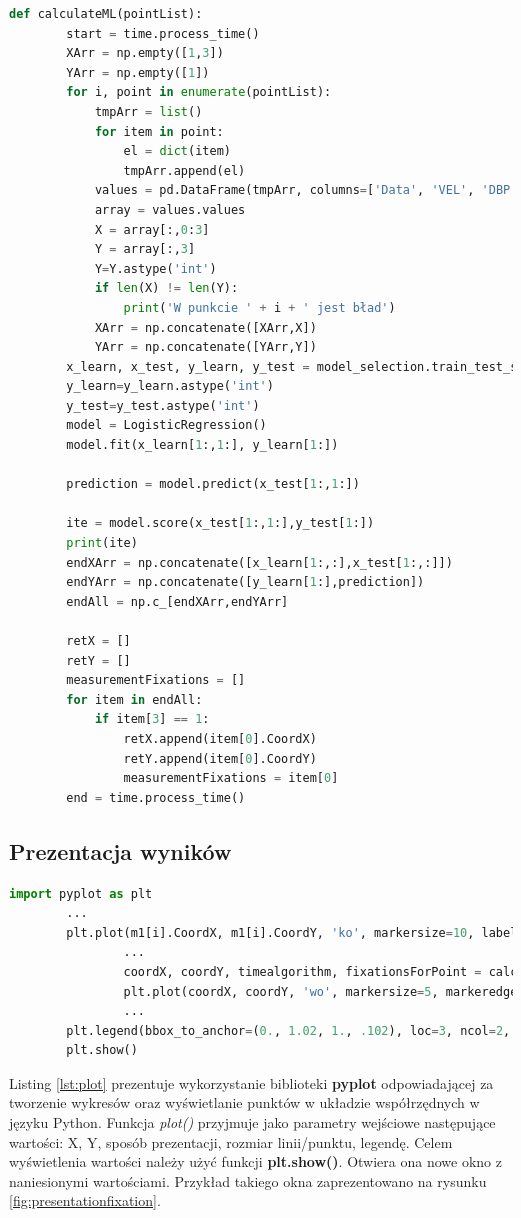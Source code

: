 \begin{lstlisting}[language=Python, caption=Algorytm wykorzystujący uczenie maszynowe, label={lst:mlalgorithm}]
def calculateML(pointList):
        start = time.process_time()
        XArr = np.empty([1,3])
        YArr = np.empty([1])
        for i, point in enumerate(pointList):
            tmpArr = list()
            for item in point:
                el = dict(item)
                tmpArr.append(el)
            values = pd.DataFrame(tmpArr, columns=['Data', 'VEL', 'DBP', 'FIX'])
            array = values.values
            X = array[:,0:3]
            Y = array[:,3]
            Y=Y.astype('int')
            if len(X) != len(Y):
                print('W punkcie ' + i + ' jest bład')
            XArr = np.concatenate([XArr,X])
            YArr = np.concatenate([YArr,Y])
        x_learn, x_test, y_learn, y_test = model_selection.train_test_split(XArr, YArr, test_size=0.8)
        y_learn=y_learn.astype('int')
        y_test=y_test.astype('int')
        model = LogisticRegression()
        model.fit(x_learn[1:,1:], y_learn[1:])
    
        prediction = model.predict(x_test[1:,1:])
        
        ite = model.score(x_test[1:,1:],y_test[1:])
        print(ite)
        endXArr = np.concatenate([x_learn[1:,:],x_test[1:,:]])
        endYArr = np.concatenate([y_learn[1:],prediction])
        endAll = np.c_[endXArr,endYArr]
    
        retX = []
        retY = []
        measurementFixations = []
        for item in endAll:
            if item[3] == 1:
                retX.append(item[0].CoordX)
                retY.append(item[0].CoordY)
                measurementFixations = item[0]
        end = time.process_time()
\end{lstlisting}

\subsection{Prezentacja wyników}
\label{ssec:datashow}
\begin{lstlisting}[language=Python, caption=Wyświetlanie wyników, label={lst:plot}]
        import pyplot as plt
        ...
        plt.plot(m1[i].CoordX, m1[i].CoordY, 'ko', markersize=10, label='Eye-tracker points' if i == 0 else "")
                ...
                coordX, coordY, timealgorithm, fixationsForPoint = calculateIdtAlgorithm(m1)
                plt.plot(coordX, coordY, 'wo', markersize=5, markeredgecolor='r', label='Calculated fixations')
                ...
        plt.legend(bbox_to_anchor=(0., 1.02, 1., .102), loc=3, ncol=2, mode="expand", borderaxespad=0.)
        plt.show()
\end{lstlisting}
Listing \ref{lst:plot} prezentuje wykorzystanie biblioteki \textbf{pyplot} odpowiadającej za tworzenie wykresów oraz wyświetlanie punktów w układzie współrzędnych w języku Python. Funkcja \emph{plot()} przyjmuje jako parametry wejściowe następujące wartości: X, Y, sposób prezentacji, rozmiar linii/punktu, legendę. Celem wyświetlenia wartości należy użyć funkcji \textbf{plt.show()}. Otwiera ona nowe okno z naniesionymi wartościami. Przykład takiego okna zaprezentowano na rysunku \ref{fig:presentationfixation}.
